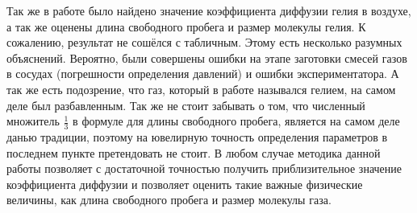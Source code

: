 \documentclass[a4paper,12pt]{article}
\begin{document}
\begin{enumerate}
Так же в работе было найдено значение коэффициента диффузии гелия в воздухе, а так же оценены длина свободного пробега и размер молекулы гелия. К сожалению, результат не сошёлся с табличным. Этому есть несколько разумных объяснений. Вероятно, были совершены ошибки на этапе заготовки смесей газов в сосудах (погрешности определения давлений) и ошибки экспериментатора. А так же есть подозрение, что газ, который в работе назывался гелием, на самом деле был разбавленным. Так же не стоит забывать о том, что численный множитель $\frac{1}{3}$ в формуле для длины свободного пробега, является на самом деле данью традиции, поэтому на ювелирную точность определения параметров в последнем пункте претендовать не стоит. В любом случае методика данной работы позволяет с достаточной точностью получить приблизительное значение коэффициента диффузии и позволяет оценить такие важные физические величины, как длина свободного пробега и размер молекулы газа.

\end{enumerate}
\end{document}
